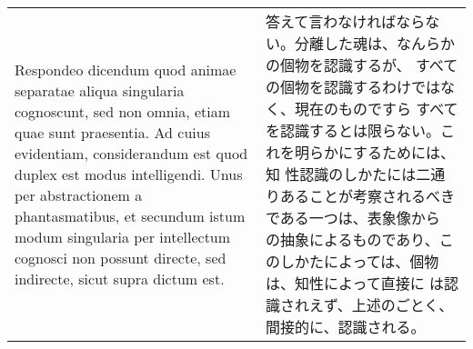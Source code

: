 \documentclass[10pt]{jsarticle} %
\begin{document}
\begin{longtable}{p{21em}p{21em}}
\\



{\sc Respondeo dicendum} quod animae separatae
 aliqua singularia cognoscunt, sed non omnia, etiam quae sunt
 praesentia. Ad cuius evidentiam, considerandum est quod duplex est
 modus intelligendi. Unus per abstractionem a phantasmatibus, et
 secundum istum modum singularia per intellectum cognosci non possunt
 directe, sed indirecte, sicut supra dictum est. 


& 答えて言わなければならない。分離した魂は、なんらかの個物を認識するが、
すべての個物を認識するわけではなく、現在のものですら
すべてを認識するとは限らない。これを明らかにするためには、知
性認識のしかたには二通りあることが考察されるべきである一つは、表象像から
の抽象によるものであり、このしかたによっては、個物は、知性によって直接に
は認識されえず、上述のごとく、
間接的に、認識される。



\end{longtable}
\end{document}

